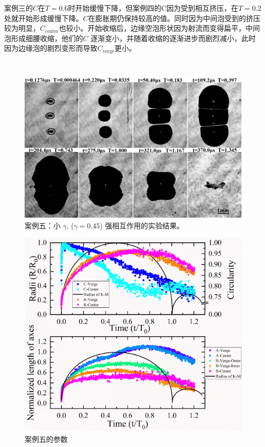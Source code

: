 案例三的$C$在$T=0.6$时开始缓慢下降，但案例四的C因为受到相互挤压，在$T=0.2$处就开始形成缓慢下降。$C$在膨胀期仍保持较高的值。同时因为中间泡受到的挤压较为明显，$C_\mathrm {center}$也较小。开始收缩后，边缘空泡形状因为射流而变得扁平，中间泡形成细腰收缩，他们的$C$
逐渐变小，并随着收缩的逐渐进步而剧烈减小，此时因为边缘泡的剧烈变形而导致$C_\mathrm {verge}$更小。

~

\begin{figure}[H]
    \centering
    \includegraphics[width=0.8\linewidth]{img/fig4.11.png}
    \caption{案例五：小
$\gamma$, ($\gamma=0.45$) 强相互作用的实验结果。}
    \label{fig:4.11}
\end{figure}


\begin{figure}[H]
    \centering
    \includegraphics[width=0.8\linewidth]{img/fig4.12.png}
    \caption{案例五的参数}
    \label{fig:4.12}
\end{figure}


